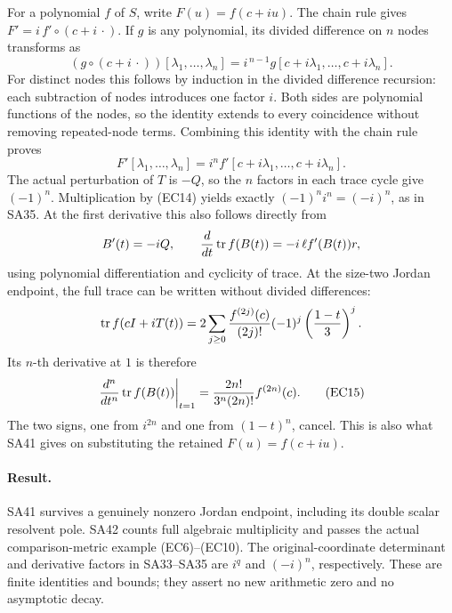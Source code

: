 \documentclass[11pt]{article}
\begin{document}
For a polynomial \(f\) of \(S\), write \(F(u)=f(c+iu)\).
The chain rule gives \(F'=i\,f'\circ(c+i\,\cdot)\).
If \(g\) is any polynomial, its divided difference on \(n\)
nodes transforms as
\[
 (g\circ(c+i\,\cdot))[\lambda_1,\ldots,\lambda_n]
   =i^{\,n-1}g[c+i\lambda_1,\ldots,c+i\lambda_n].
\]
For distinct nodes this follows by induction in the divided
difference recursion: each subtraction of nodes introduces
one factor \(i\). Both sides are polynomial functions of
the nodes, so the identity extends to every coincidence
without removing repeated-node terms.
Combining this identity with the chain rule proves
\begin{equation}
 F'[\lambda_1,\ldots,\lambda_n]
   =i^n f'[c+i\lambda_1,\ldots,c+i\lambda_n].
 \tag{EC14}
\end{equation}
The actual perturbation of \(T\) is \(-Q\), so the
\(n\) factors in each trace cycle give \((-1)^n\).
Multiplication by (EC14) yields exactly
\((-1)^ni^n=(-i)^n\), as in SA35.
At the first derivative this also follows directly from
\[
 B'(t)=-iQ,\qquad
 \frac{d}{dt}\operatorname{tr} f(B(t))=-i\,\ell f'(B(t))r,
\]
using polynomial differentiation and cyclicity of trace.
At the size-two Jordan endpoint, the full trace can be
written without divided differences:
\[
 \operatorname{tr} f(cI+iT(t))
   =2\sum_{j\ge0}\frac{f^{(2j)}(c)}{(2j)!}
       (-1)^j\left(\frac{1-t}{3}\right)^j .
\]
Its \(n\)-th derivative at \(1\) is therefore
\begin{equation}
 \left.\frac{d^n}{dt^n}\operatorname{tr} f(B(t))\right|_{t=1}
   =\frac{2n!}{3^n(2n)!}f^{(2n)}(c).
 \tag{EC15}
\end{equation}
The two signs, one from \(i^{2n}\) and one from
\((1-t)^n\), cancel. This is also what SA41 gives on
substituting the retained \(F(u)=f(c+iu)\).

\paragraph{Result.}
SA41 survives a genuinely nonzero Jordan endpoint, including its
double scalar resolvent pole. SA42 counts full algebraic multiplicity
and passes the actual comparison-metric example (EC6)--(EC10).
The original-coordinate determinant and derivative factors in
SA33--SA35 are \(i^q\) and \((-i)^n\), respectively.
These are finite identities and bounds; they assert no new arithmetic
zero and no asymptotic decay.

\endgroup

\clearpage\begingroup
\end{document}
